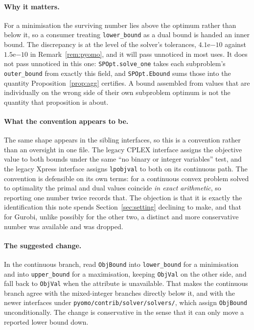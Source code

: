 \documentclass[11pt]{article}
\theoremstyle{plain}
\theoremstyle{remark}
\begin{document}
\paragraph{Why it matters.}
For a minimisation the surviving number lies above the optimum rather than
below it, so a consumer treating \texttt{lower\_bound} as a dual bound is
handed an inner bound.  The discrepancy is at the level of the solver's
tolerances, $4.1\mathrm{e}{-10}$ against $1.5\mathrm{e}{-10}$ in
Remark~\ref{rem:pyomo}, and it will pass unnoticed in most uses.  It does not
pass unnoticed in this one: \texttt{SPOpt.solve\_one} takes each subproblem's
\texttt{outer\_bound} from exactly this field, and \texttt{SPOpt.Ebound} sums
those into the quantity Proposition~\ref{prop:agg} certifies.  A bound
assembled from values that are individually on the wrong side of their own
subproblem optimum is not the quantity that proposition is about.

\paragraph{What the convention appears to be.}
The same shape appears in the sibling interfaces, so this is a convention
rather than an oversight in one file.  The legacy CPLEX interface assigns the
objective value to both bounds under the same ``no binary or integer
variables'' test, and the legacy Xpress interface assigns \texttt{lpobjval} to
both on its continuous path.  The convention is defensible on its own terms:
for a continuous convex problem solved to optimality the primal and dual values
coincide \emph{in exact arithmetic}, so reporting one number twice records
that.  The objection is that it is exactly the identification this note spends
Section~\ref{sec:setting} declining to make, and that for Gurobi, unlike
possibly for the other two, a distinct and more conservative number was
available and was dropped.

\paragraph{The suggested change.}
In the continuous branch, read \texttt{ObjBound} into \texttt{lower\_bound} for
a minimisation and into \texttt{upper\_bound} for a maximisation, keeping
\texttt{ObjVal} on the other side, and fall back to \texttt{ObjVal} when the
attribute is unavailable.  That makes the continuous branch agree with the
mixed-integer branches directly below it, and with the newer interfaces under
\texttt{pyomo/contrib/solver/solvers/}, which assign \texttt{ObjBound}
unconditionally.  The change is conservative in the sense that it can only
move a reported lower bound down.
\end{document}
